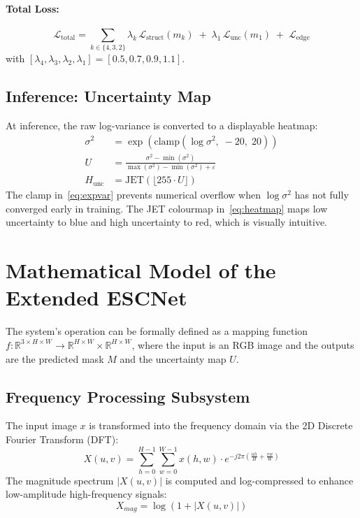\documentclass[12pt,a4paper]{report}
\begin{document}
\paragraph{Total Loss:}
\begin{equation}
  \mathcal{L}_{\text{total}} = \!\!\sum_{k \in \{4,3,2\}}\!\! \lambda_k\,\mathcal{L}_{\text{struct}}(m_k)
  \;+\; \lambda_1\,\mathcal{L}_{\text{unc}}(m_1)
  \;+\; \mathcal{L}_{\text{edge}}
  \label{eq:totalloss}
\end{equation}
with $[\lambda_4,\lambda_3,\lambda_2,\lambda_1] = [0.5, 0.7, 0.9, 1.1]$.

\subsection{Inference: Uncertainty Map}

At inference, the raw log-variance is converted to a displayable heatmap:
\begin{align}
  \sigma^2 &= \exp(\text{clamp}(\log\sigma^2,\; -20,\; 20)) \label{eq:expvar}\\
  U &= \frac{\sigma^2 - \min(\sigma^2)}{\max(\sigma^2) - \min(\sigma^2) + \varepsilon} \label{eq:unorm}\\
  H_{\text{unc}} &= \text{JET}\!\left(\lfloor 255 \cdot U \rfloor\right) \label{eq:heatmap}
\end{align}
The clamp in~\eqref{eq:expvar} prevents numerical overflow when $\log\sigma^2$ has not fully converged early in training. The JET colourmap in~\eqref{eq:heatmap} maps low uncertainty to blue and high uncertainty to red, which is visually intuitive.

\section{Mathematical Model of the Extended ESCNet}\label{sec:mathmodel}

The system's operation can be formally defined as a mapping function $f: \mathbb{R}^{3\times H \times W} \to \mathbb{R}^{H \times W} \times \mathbb{R}^{H \times W}$, where the input is an RGB image and the outputs are the predicted mask $M$ and the uncertainty map $U$.

\subsection{Frequency Processing Subsystem}
The input image $x$ is transformed into the frequency domain via the 2D Discrete Fourier Transform (DFT):
\begin{equation}
    X(u,v) = \sum_{h=0}^{H-1} \sum_{w=0}^{W-1} x(h,w) \cdot e^{-j2\pi \left(\frac{uh}{H} + \frac{vw}{W}\right)}
\end{equation}
The magnitude spectrum $|X(u,v)|$ is computed and log-compressed to enhance low-amplitude high-frequency signals:
\begin{equation}
    X_{mag} = \log(1 + |X(u,v)|)
\end{equation}
\end{document}
